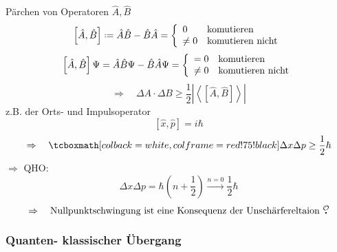 Pärchen von Operatoren $ \hat{A}, \hat{B} $
\begin{equation*}
\left[\hat{A}, \hat{B}\right] \defeq \hat{A} \hat{B} - \hat{B} \hat{A} = \casess{0}{\tx{komutieren}}{\neq 0}{\tx{komutieren nicht}}
\end{equation*}
\begin{equation*}
\left[\hat{A}, \hat{B}\right] \Psi = \hat{A} \hat{B} \Psi - \hat{B} \hat{A} \Psi = \left\{ \begin{array}{ll} {= 0} & {\textrm{komutieren}} \\ {\neq 0} & {\textrm{komutieren nicht}} \end{array} \right.
\end{equation*}
\begin{equation*}
\Rightarrow \quad \Delta A \cdot \Delta B \ge \frac{1}{2} \left|\left\langle \left[\hat{A}, \hat{B}\right] \right\rangle\right|
\end{equation*}
z.B. der Orts- und Impulsoperator
\begin{equation*}
\left[\hat{x}, \hat{p}\right] = i \hbar
\end{equation*}
\begin{equation*}
\Rightarrow \quad \rmbox{\Delta x \Delta p \ge \frac{1}{2} \hbar}
\end{equation*}
$ \Rightarrow $ QHO:
\begin{equation*}
\Delta x \Delta p = \hbar \left(n + \frac{1}{2}\right) \overset{n = 0}{\longrightarrow} \frac{1}{2} \hbar
\end{equation*}
\begin{equation*}
\Rightarrow \quad \tx{Nullpunktschwingung ist eine Konsequenz der Unschärfereltaion \mau}
\end{equation*}

\subsubsection{Quanten- klassischer Übergang}

